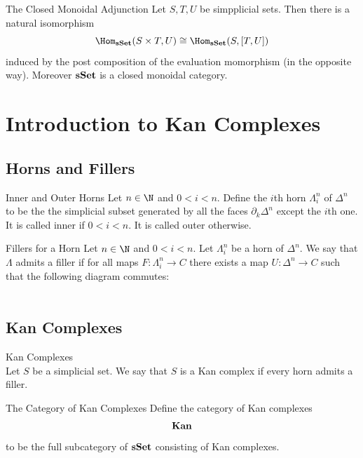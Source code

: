 \documentclass[a4paper]{article}
\begin{document}
\begin{thm}{The Closed Monoidal Adjunction}{} Let $S,T,U$ be simpplicial sets. Then there is a natural isomorphism $$\Hom_\bold{sSet}(S\times T,U)\cong\Hom_\bold{sSet}(S,[T,U])$$ induced by the post composition of the evaluation momorphism (in the opposite way). Moreover $\bold{sSet}$ is a closed monoidal category. 
\end{thm}

\pagebreak
\section{Introduction to Kan Complexes}
\subsection{Horns and Fillers}
\begin{defn}{Inner and Outer Horns}{} Let $n\in\N$ and $0<i<n$. Define the $i$th horn $\Lambda_i^n$ of $\Delta^n$ to be the the simplicial subset generated by all the faces $\partial_k\Delta^n$ except the $i$th one. It is called inner if $0<i<n$. It is called outer otherwise. 
\end{defn}

\begin{defn}{Fillers for a Horn}{} Let $n\in\N$ and $0<i<n$. Let $\Lambda_i^n$ be a horn of $\Delta^n$. We say that $\Lambda$ admits a filler if for all maps $F:\Lambda_i^n\to C$ there exists a map $U:\Delta^n\to C$ such that the following diagram commutes: \\~\\
\end{defn}

\subsection{Kan Complexes}
\begin{defn}{Kan Complexes}{}\\
Let $S$ be a simplicial set. We say that $S$ is a Kan complex if every horn admits a filler. 
\end{defn}

\begin{defn}{The Category of Kan Complexes}{} Define the category of Kan complexes $$\bold{Kan}$$ to be the full subcategory of $\bold{sSet}$ consisting of Kan complexes. 
\end{defn}
\end{document}
